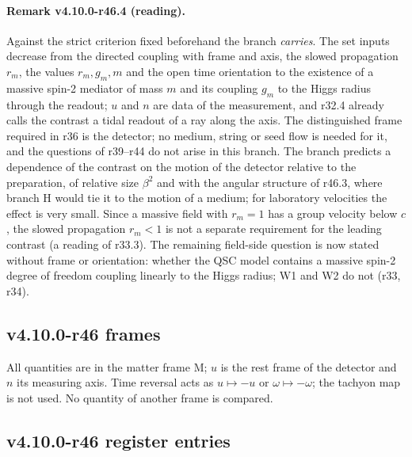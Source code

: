 \paragraph{Remark v4.10.0-r46.4 (reading).}
Against the strict criterion fixed beforehand the branch \emph{carries}.  The set inputs decrease from the directed coupling with frame and axis, the
slowed propagation \(r_m\), the values \(r_m,g_m,m\) and the open time orientation to the existence of a massive spin-2 mediator of mass \(m\) and its coupling
\(g_m\) to the Higgs radius through the readout; \(u\) and \(n\) are data of the measurement, and r32.4 already calls the contrast a tidal readout of a ray along
the axis.  The distinguished frame required in r36 is the detector; no medium, string or seed flow is needed for it, and the questions of r39--r44
do not arise in this branch.  The branch predicts a dependence of the contrast on the motion of the detector relative to the preparation, of relative
size \(\beta^2\) and with the angular structure of r46.3, where branch H would tie it to the motion of a medium; for laboratory velocities the effect is
very small.  Since a massive field with \(r_m=1\) has a group velocity below \(c\), the slowed propagation \(r_m<1\) is not a separate requirement for the leading
contrast (a reading of r33.3).  The remaining field-side question is now stated without frame or orientation: whether the QSC model contains a
massive spin-2 degree of freedom coupling linearly to the Higgs radius; W1 and W2 do not (r33, r34).

\subsection*{v4.10.0-r46 frames}
\label{subsec:v4100-r46-frames}

All quantities are in the matter frame M; \(u\) is the rest frame of the detector and \(n\) its measuring axis.  Time reversal acts as \(u\mapsto-u\) or \(\omega\mapsto-\omega\); the
tachyon map is not used.  No quantity of another frame is compared.

\subsection*{v4.10.0-r46 register entries}
\label{subsec:v4100-r46-register}

